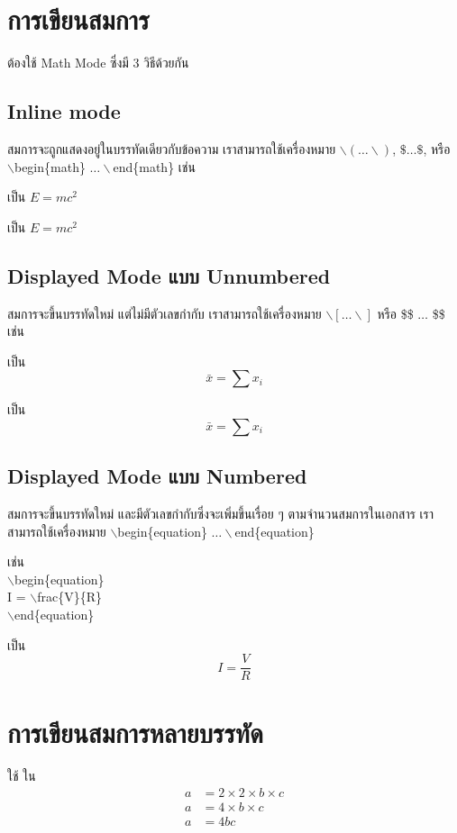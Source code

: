 \documentclass[12pt,a4paper]{article} %
\begin{document}
\section{การเขียนสมการ}
ต้องใช้ Math Mode ซึ่งมี 3 วิธีด้วยกัน

\subsection{Inline mode}
สมการจะถูกแสดงอยู่ในบรรทัดเดียวกับข้อความ เราสามารถใช้เครื่องหมาย $\backslash( \dots \backslash)$, $\$ \dots \$$, หรือ $\backslash$begin\{math\} $\dots \backslash$end\{math\} เช่น

 เป็น $E = mc^2$

 เป็น \( E = mc^2 \)

\subsection{Displayed Mode แบบ Unnumbered}
สมการจะขึ้นบรรทัดใหม่ แต่ไม่มีตัวเลขกำกับ เราสามารถใช้เครื่องหมาย $\backslash[ \dots \backslash]$ หรือ \$\$ $\dots$ \$\$ เช่น

\code{$\backslash[$ $\backslash$bar\{x\} = $\backslash$sum x\_i $\backslash]$} เป็น
\[ \bar{x} = \sum x_i \]

 เป็น
$$ \bar{x} = \sum x_i $$

\subsection{Displayed Mode แบบ Numbered}
สมการจะขึ้นบรรทัดใหม่ และมีตัวเลขกำกับซึ่งจะเพิ่มขึ้นเรื่อย ๆ ตามจำนวนสมการในเอกสาร เราสามารถใช้เครื่องหมาย $\backslash$begin\{equation\} $\dots \backslash$end\{equation\}

เช่น \\
$\backslash$begin\{equation\} \\
I = $\backslash$frac\{V\}\{R\} \\
$\backslash$end\{equation\}

เป็น
\begin{equation}
I = \frac{V}{R}
\end{equation}

\section{การเขียนสมการหลายบรรทัด}
ใช้  ใน 
\begin{equation}
\begin{aligned}
a & = 2 \times 2 \times b \times c \\
a & = 4 \times b \times c \\
a & = 4bc
\end{aligned}
\end{equation}
\end{document}
